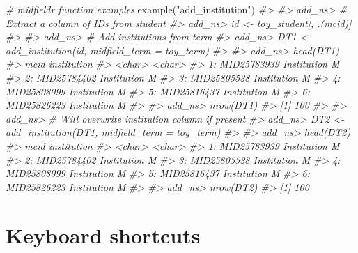 \documentclass[
]{book}
\newenvironment{Shaded}{\begin{snugshade}}{\end{snugshade}}
\newcommand{\CommentTok}[1]{\textcolor[rgb]{0.56,0.35,0.01}{\textit{#1}}}
\newcommand{\FunctionTok}[1]{\textcolor[rgb]{0.00,0.00,0.00}{#1}}
\newcommand{\NormalTok}[1]{#1}
\newcommand{\StringTok}[1]{\textcolor[rgb]{0.31,0.60,0.02}{#1}}
\begin{document}
\begin{Shaded}
\begin{Highlighting}[]
\CommentTok{\# midfieldr function examples}
\FunctionTok{example}\NormalTok{(}\StringTok{"add\_institution"}\NormalTok{)}
\CommentTok{\#\textgreater{} }
\CommentTok{\#\textgreater{} add\_ns\textgreater{} \# Extract a column of IDs from student}
\CommentTok{\#\textgreater{} add\_ns\textgreater{} id \textless{}{-} toy\_student[, .(mcid)]}
\CommentTok{\#\textgreater{} }
\CommentTok{\#\textgreater{} add\_ns\textgreater{} \# Add institutions from term}
\CommentTok{\#\textgreater{} add\_ns\textgreater{} DT1 \textless{}{-} add\_institution(id, midfield\_term = toy\_term)}
\CommentTok{\#\textgreater{} }
\CommentTok{\#\textgreater{} add\_ns\textgreater{} head(DT1)}
\CommentTok{\#\textgreater{}           mcid   institution}
\CommentTok{\#\textgreater{}         \textless{}char\textgreater{}        \textless{}char\textgreater{}}
\CommentTok{\#\textgreater{} 1: MID25783939 Institution M}
\CommentTok{\#\textgreater{} 2: MID25784402 Institution M}
\CommentTok{\#\textgreater{} 3: MID25805538 Institution M}
\CommentTok{\#\textgreater{} 4: MID25808099 Institution M}
\CommentTok{\#\textgreater{} 5: MID25816437 Institution M}
\CommentTok{\#\textgreater{} 6: MID25826223 Institution M}
\CommentTok{\#\textgreater{} }
\CommentTok{\#\textgreater{} add\_ns\textgreater{} nrow(DT1)}
\CommentTok{\#\textgreater{} [1] 100}
\CommentTok{\#\textgreater{} }
\CommentTok{\#\textgreater{} add\_ns\textgreater{} \# Will overwrite institution column if present}
\CommentTok{\#\textgreater{} add\_ns\textgreater{} DT2 \textless{}{-} add\_institution(DT1, midfield\_term = toy\_term)}
\CommentTok{\#\textgreater{} }
\CommentTok{\#\textgreater{} add\_ns\textgreater{} head(DT2)}
\CommentTok{\#\textgreater{}           mcid   institution}
\CommentTok{\#\textgreater{}         \textless{}char\textgreater{}        \textless{}char\textgreater{}}
\CommentTok{\#\textgreater{} 1: MID25783939 Institution M}
\CommentTok{\#\textgreater{} 2: MID25784402 Institution M}
\CommentTok{\#\textgreater{} 3: MID25805538 Institution M}
\CommentTok{\#\textgreater{} 4: MID25808099 Institution M}
\CommentTok{\#\textgreater{} 5: MID25816437 Institution M}
\CommentTok{\#\textgreater{} 6: MID25826223 Institution M}
\CommentTok{\#\textgreater{} }
\CommentTok{\#\textgreater{} add\_ns\textgreater{} nrow(DT2)}
\CommentTok{\#\textgreater{} [1] 100}
\end{Highlighting}
\end{Shaded}

\hypertarget{keyboard-shortcuts}{%
\section{Keyboard shortcuts}\label{keyboard-shortcuts}}
\end{document}
